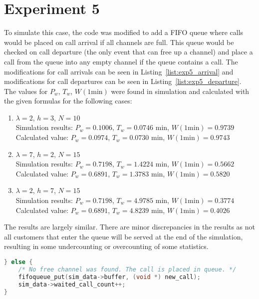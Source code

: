 \section*{Experiment 5}
To simulate this case, the code was modified to add a FIFO queue where calls would be placed on call arrival if all channels are full. This queue would be checked on call departure (the only event that can free up a channel) and place a call from the queue into any empty channel if the queue contains a call. The modifications for call arrivals can be seen in Listing~\ref{list:exp5_arrival} and modifications for call departures can be seen in Listing~\ref{list:exp5_departure}. The values for $P_w$, $T_w$, $W(1 \text{min})$ were found in simulation and calculated with the given formulas for the following cases:
\begin{enumerate}
\item
$\lambda = 2$, $h = 3$, $N = 10$\\
Simulation results: $P_w = 0.1006$, $T_w = 0.0746$ min, $W(1 \text{min}) = 0.9739$\\
Calculated value: $P_w = 0.0974$, $T_w = 0.0730$ min, $W(1 \text{min}) = 0.9743$

\item
$\lambda = 7$, $h = 2$, $N = 15$\\
Simulation results: $P_w = 0.7198$, $T_w = 1.4224$ min, $W(1 \text{min}) = 0.5662$\\
Calculated value: $P_w = 0.6891$, $T_w = 1.3783$ min, $W(1 \text{min}) = 0.5820$

\item 
$\lambda = 2$, $h = 7$, $N = 15$\\
Simulation results: $P_w = 0.7198$, $T_w = 4.9785$ min, $W(1 \text{min}) = 0.3774$\\
Calculated value: $P_w = 0.6891$, $T_w = 4.8239$ min, $W(1 \text{min}) = 0.4026$
\end{enumerate}

The results are largely similar. There are minor discrepancies in the results as not all customers that enter the queue will be served at the end of the simulation, resulting in some undercounting or overcounting of some statistics.

\begin{lstlisting}[language=c,caption=Wait on Call Arrival, label=list:exp5_arrival]
} else {
	/* No free channel was found. The call is placed in queue. */
	fifoqueue_put(sim_data->buffer, (void *) new_call);
	sim_data->waited_call_count++;
}
\end{lstlisting}

